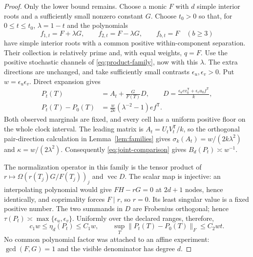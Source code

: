 \begin{proof}
Only the lower bound remains. Choose a monic $F$ with $d$ simple
interior roots and a sufficiently small nonzero constant $G$. Choose
$t_0>0$ so that, for $0\le t\le t_0$, $\lambda=1-t$ and the polynomials
\begin{equation}\label{eq:degree-product}
 f_{1,t}=F+\lambda G,\qquad f_{2,t}=F-\lambda G,
 \qquad f_{b,t}=F\quad(b\ge3)
\end{equation}
have simple interior roots with a common positive within-component
separation. Their collection is relatively prime and, with equal
weights, $q=F$. Use the positive stochastic channels of
\eqref{eq:product-family}, now with this $\lambda$. The extra directions
are unchanged, and take sufficiently small contrasts
$\epsilon_u,\epsilon_v>0$. Put $w=\epsilon_u\epsilon_v$.
Direct expansion gives
\begin{align}
 P_t(T)&=A_t+\frac{G}{F(T)}D,\qquad
 D=\frac{\epsilon_u ev_0^{\mathsf T}+\epsilon_vu_0f^{\mathsf T}}{k},
                                                        \label{eq:degree-identity}\\
 P_t(T)-P_0(T)&=\frac{w}{2k}(\lambda^{-2}-1)ef^{\mathsf T}.
                                                        \label{eq:degree-difference}
\end{align}
Both observed marginals are fixed, and every cell has a uniform positive
floor on the whole clock interval. The leading matrix is
$A_t=U_tV_t^{\mathsf T}/k$, so the orthogonal pair-direction calculation
in Lemma~\ref{lem:families} gives
$\sigma_k(A_t)=w/(2k\lambda^2)$ and $\kappa=w/(2\lambda^2)$.
Consequently \eqref{eq:joint-comparison} gives $B_d(P_t)\asymp w^{-1}$.

The normalization operator in this family is the tensor product of
$r\mapsto\Omega(r(T_j)G/F(T_j))_j$ and $\operatorname{vec}D$.
The scalar map is injective: an interpolating polynomial would give
$FH-rG=0$ at $2d+1$ nodes, hence identically, and coprimality forces
$F\mid r$, so $r=0$. Its least singular value is a fixed positive
number. The two summands in $D$ are Frobenius orthogonal; hence
$\tau(P_t)\asymp\max\{\epsilon_u,\epsilon_v\}$. Uniformly over
the declared ranges, therefore,
\begin{equation}\label{eq:degree-signal}
 c_1w\le\eta_d(P_t)\le C_1w,\qquad
 \sup_T\|P_t(T)-P_0(T)\|_F\le C_2wt.
\end{equation}
No common polynomial factor was attached to an affine experiment:
$\gcd(F,G)=1$ and the visible denominator has degree $d$.


\end{proof}
